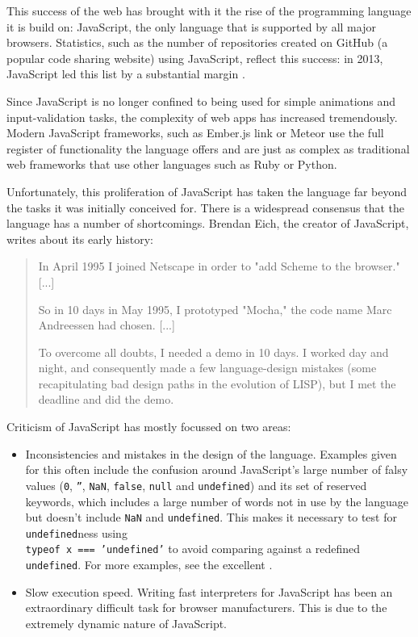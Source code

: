 \documentclass[11pt]{report}
\begin{document}
This success of the web has brought with it the rise of the programming language it is build on: JavaScript, the only language that is supported by all major browsers. Statistics, such as the number of repositories created on GitHub (a popular code sharing website) using JavaScript, reflect this success: in 2013, JavaScript led this list by a substantial margin \cite{githubarchive} \cite{topgithub}.

Since JavaScript is no longer confined to being used for simple animations and input-validation tasks, the complexity of web apps has increased tremendously. Modern JavaScript frameworks, such as Ember.js link or Meteor use the full register of functionality the language offers and are just as complex as traditional web frameworks that use other languages such as Ruby or Python.

Unfortunately, this proliferation of JavaScript has taken the language far beyond the tasks it was initially conceived for. There is a widespread consensus that the language has a number of shortcomings. Brendan Eich, the creator of JavaScript, writes\cite{brendeich} about its early history:
\begin{quote}
In April 1995 I joined Netscape in order to "add Scheme to the browser." [...]

So in 10 days in May 1995, I prototyped "Mocha," the code name Marc Andreessen had chosen. [...]

To overcome all doubts, I needed a demo in 10 days. I worked day and night, and consequently made a few language-design mistakes (some recapitulating bad design paths in the evolution of LISP), but I met the deadline and did the demo.
\end{quote}

Criticism of JavaScript has mostly focussed on two areas:
\begin{itemize}
\item Inconsistencies and mistakes in the design of the language. Examples given for this often include the confusion around JavaScript's large number of falsy values (\texttt{0},  \texttt{''}, \texttt{NaN}, \texttt{false}, \texttt{null} and \texttt{undefined}) and its set of reserved keywords, which includes a large number of words not in use by the language but doesn't include \texttt{NaN} and \texttt{undefined}. This makes it necessary to test for \texttt{undefined}ness using \\
\mbox{\texttt{typeof x === 'undefined'}} to avoid comparing against a redefined \texttt{undefined}. For more examples, see the excellent \cite{jsgoodparts}.
\item Slow execution speed. Writing fast interpreters for JavaScript has been an extraordinary difficult task for browser manufacturers. This is due to the extremely dynamic nature of JavaScript.
\end{itemize}
\end{document}
